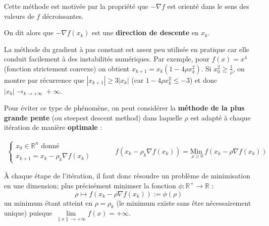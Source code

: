 \documentclass[a4paper,11pt]{article}
\newcommand{\R}{\mathbb{R}}
\newcommand{\norm}[1]{\left\lVert#1\right\rVert}
\newcommand{\deffonc}[3]{#1 : #2 \longrightarrow #3}
\newcommand{\MinI}[1]{\underset{#1}{\text{Min }}}
\theoremstyle{plain} %
\begin{document}
Cette méthode est motivée par la propriété que $-\nabla f$ est orienté dans
le sens des valeurs de $f$ décroissantes.

On dit alors que $- \nabla f(x_k)$ est une \textbf{direction de descente} en $x_k$.

La méthode du gradient à pas constant est assez peu utilisée en pratique
car elle conduit facilement à des instabilités numériques. Par exemple,
pour $f(x) = x^4$ (fonction strictement convexe) on obtient $x_{k+1} = x_k(1-4 \rho x_k^2)$. Si $x_0^2 \geq \frac{1}{\rho}$, on montre par récurrence que
$|x_{k+1}| \geq 3 |x_k|$ (car $1-4\rho x_k^2 \leq - 3$) et donc $|x_k| \longrightarrow_{k\to +\infty} + \infty$.

Pour éviter ce type de phénomène, on peut considérer la \textbf{méthode de la
plus grande pente} (ou steepest descent method) dans laquelle $\rho$ est adapté
à chaque itération de manière \textbf{optimale} :

\[
    \begin{array}{cc}
        \left\lbrace
        \begin{array}{c}
            x_0 \in \R^n \text{ donné} \\[5pt]
            x_{k+1} = x_k - \rho_k \nabla f (x_k)
        \end{array}
        \right.
        & \hspace{1cm}
        f\left(x_k - \rho_k \nabla f(x_k)\right) = \MinI{\rho \geq 0} f \left(x_k - \rho \nabla f(x_k) \right)
    \end{array}
\]

À chaque étape de l'itération, il faut donc résoudre un problème de minimisation
en une dimension; plus précisément minimser la fonction $\deffonc{\phi}{\R^+}{\R}$ :
\[
    \rho \mapsto f(x_k - \rho \nabla f(x_k) ) := \phi (\rho)
\]
un minimum étant atteint en $\rho = \rho_k$ (le minimum existe sans être
nécessairement unique) puisque $\underset{\norm{x} \to +\infty}{\lim} f(x) = +\infty$.
\end{document}
